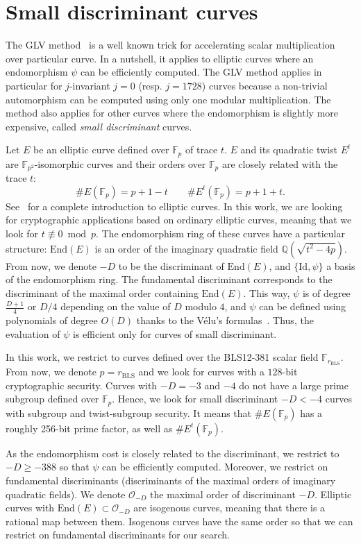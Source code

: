 \documentclass{article}
\newcommand{\Q}{\ensuremath{\mathbb Q}}
\newcommand{\Fp}{\ensuremath{\mathbb F_p}}
\newcommand{\End}{\ensuremath{\text{End}}}
\theoremstyle{definition}
\begin{document}
\section{Small discriminant curves}\label{sec:small-disc-curves}

The GLV method~\cite{C:GalLamVan01} is a well known trick for accelerating
scalar multiplication over particular curve. In a nutshell, it applies
to elliptic curves where an endomorphism $\psi$ can be efficiently computed.
The GLV method applies in particular for $j$-invariant $j=0$
(resp. $j=1728$) curves because a non-trivial automorphism can be
computed using only one modular multiplication. %
The method also applies for other curves where the endomorphism is
slightly more expensive, called \emph{small discriminant} curves.

Let $E$ be an elliptic curve defined over $\Fp$ of trace $t$. $E$ and
its quadratic twist $E^t$ are $\mathbb F_{p^2}$-isomorphic curves and
their orders over $\Fp$ are closely related with the trace
$t$:
$$\#E(\Fp) = p+1-t\qquad \#E^t(\Fp) = p+1+t.$$
See~\cite{Silverman86} for a complete introduction to elliptic curves.
In this work, we are looking for cryptographic applications based on
ordinary elliptic curves, meaning that we look for $t\not\equiv 0
\bmod p$. The endomorphism ring of these curves have a particular
structure: $\End(E)$ is an order of the imaginary quadratic field
$\Q(\sqrt{t^2-4p})$.
From now, we denote $-D$ to be the discriminant of $\End(E)$, and
$\{\text{Id},\psi\}$ a basis of the endomorphism ring.
The fundamental discriminant corresponds to the discriminant of the
maximal order containing $\End(E)$.
This way, $\psi$ is of degree $\frac{D+1}4$ or $D/4$ depending on the
value of $D$ modulo $4$, and $\psi$ can be defined using polynomials
of degree $O(D)$ thanks to the Vélu's formulas~\cite{velu71}.
Thus, the evaluation of $\psi$ is efficient only for curves of small
discriminant.

In this work, we restrict to curves defined over the BLS12-381 scalar
field $\mathbb F_{r_\text{BLS}}$. From now, we denote $p=r_\text{BLS}$
and we look for curves with a $128$-bit cryptographic security.
Curves with $-D=-3$ and $-4$ do not have a large prime subgroup
defined over $\Fp$.
Hence, we look for small discriminant $-D<-4$ curves with subgroup and
twist-subgroup security. It means that $\#E(\Fp)$ has a roughly 256-bit
prime factor, as well as $\#E^t(\Fp)$.

As the endomorphism cost is closely related to the discriminant, we
restrict to $-D \geq -388$ so that $\psi$ can be efficiently computed.
Moreover, we restrict on fundamental discriminants (discriminants
of the maximal orders of imaginary quadratic fields). We denote
$\mathcal O_{-D}$ the maximal order of discriminant $-D$. Elliptic
curves with $\End(E) \subset \mathcal O_{-D}$ are isogenous curves,
meaning that there is a rational map between them. Isogenous curves
have the same order so that we can restrict on fundamental
discriminants for our search.
\end{document}
